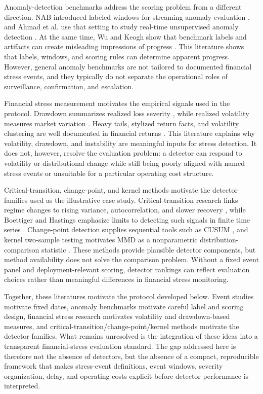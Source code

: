 \documentclass[10pt,twocolumn]{article}
\begin{document}
Anomaly-detection benchmarks address the scoring problem from a different direction. NAB introduced labeled windows for streaming anomaly evaluation \cite{lavin2015}, and Ahmad et al. use that setting to study real-time unsupervised anomaly detection \cite{ahmad2017}. At the same time, Wu and Keogh show that benchmark labels and artifacts can create misleading impressions of progress \cite{wu2022}. This literature shows that labels, windows, and scoring rules can determine apparent progress. However, general anomaly benchmarks are not tailored to documented financial stress events, and they typically do not separate the operational roles of surveillance, confirmation, and escalation.

Financial stress measurement motivates the empirical signals used in the protocol. Drawdown summarizes realized loss severity \cite{magdon2004}, while realized volatility measures market variation \cite{andersen2003}. Heavy tails, stylized return facts, and volatility clustering are well documented in financial returns \cite{mandelbrot1963,cont2001,engle1982,bollerslev1986}. This literature explains why volatility, drawdown, and instability are meaningful inputs for stress detection. It does not, however, resolve the evaluation problem: a detector can respond to volatility or distributional change while still being poorly aligned with named stress events or unsuitable for a particular operating cost structure.

Critical-transition, change-point, and kernel methods motivate the detector families used as the illustrative case study. Critical-transition research links regime changes to rising variance, autocorrelation, and slower recovery \cite{scheffer2009,dakos2012}, while Boettiger and Hastings emphasize limits to detecting such signals in finite time series \cite{boettiger2012}. Change-point detection supplies sequential tools such as CUSUM \cite{page1954}, and kernel two-sample testing motivates MMD as a nonparametric distribution-comparison statistic \cite{gretton2012}. These methods provide plausible detector components, but method availability does not solve the comparison problem. Without a fixed event panel and deployment-relevant scoring, detector rankings can reflect evaluation choices rather than meaningful differences in financial stress monitoring.

Together, these literatures motivate the protocol developed below. Event studies motivate fixed dates, anomaly benchmarks motivate careful label and scoring design, financial stress research motivates volatility and drawdown-based measures, and critical-transition/change-point/kernel methods motivate the detector families. What remains unresolved is the integration of these ideas into a transparent financial-stress evaluation standard. The gap addressed here is therefore not the absence of detectors, but the absence of a compact, reproducible framework that makes stress-event definitions, event windows, severity organization, delay, and operating costs explicit before detector performance is interpreted.
\end{document}
